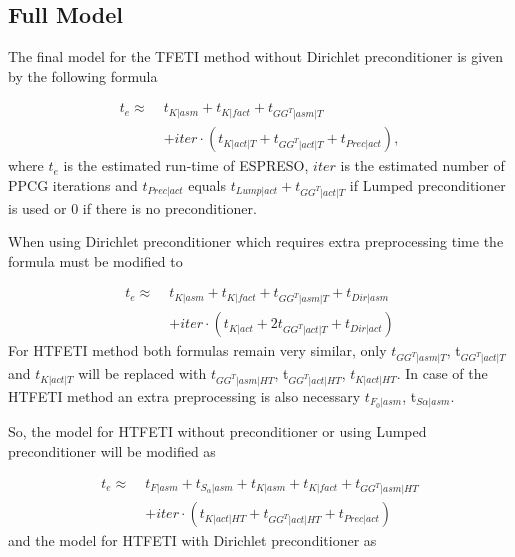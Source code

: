 \subsection{Full Model}
The final model for the TFETI method without Dirichlet preconditioner is given by the following formula

\begin{equation}
\begin{aligned}
t_e \approx\; &t_{K|asm} + t_{K|fact} + t_{GG^T|asm|T}\\ &+ iter \cdot (t_{K|act|T} + t_{GG^T|act|T} + t_{Prec|act}),
\end{aligned}
\label{eq:finalTFETI}
\end{equation}
where $t_e$ is the estimated run-time of ESPRESO, $iter$ is the estimated number of PPCG iterations  and $t_{Prec|act}$ equals $t_{Lump|act} + t_{GG^T|act|T}$ if Lumped preconditioner is used or 0 if there is no preconditioner.


When using Dirichlet preconditioner which requires extra preprocessing time the formula must be modified to

\begin{equation}
\begin{aligned}
t_e \approx\;  &t_{K|asm} + t_{K|fact} +  t_{GG^T|asm|T} +  t_{Dir|asm}\\ &+ iter\cdot(t_{K|act} + 2t_{GG^T|act|T} + t_{Dir|act})  
\end{aligned}
\label{eq:finalTFETIDirichlet}
\end{equation}
For HTFETI method both formulas remain very similar, only $t_{GG^T|asm|T}$, t$_{GG^T|act|T}$ and $t_{K|act|T}$ will be replaced with $t_{GG^T|asm|HT}$, t$_{GG^T|act|HT}$, $t_{K|act|HT}$. In case of the HTFETI method an extra preprocessing is also necessary $t_{F_0|asm}$, t$_{S\alpha|asm}$. 


So, the model for HTFETI without preconditioner or using Lumped preconditioner
will be modified as

\begin{equation}
\begin{aligned}
t_e \approx\; &t_{F|asm} + t_{S_\alpha|asm} + t_{K|asm} + t_{K|fact} + t_{GG^T|asm|HT} \\
&+ iter \cdot (t_{K|act|HT} + t_{GG^T|act|HT} + t_{Prec|act})
\end{aligned}
\label{eq:finalHTFETI}
\end{equation}
and the model for HTFETI with Dirichlet preconditioner as

